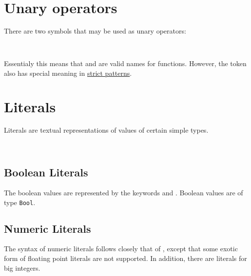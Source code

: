 \section{Unary operators}

There are two symbols that may be used as unary operators:

\begin{flushleft}
 \sym{!} \oder{} \\
   \oder{} 
\end{flushleft}

Essentialy this means that \sym{!} and  are valid names for  functions.
However, the token \sym{!} also has special meaning in  \hyperref[strictpats]{strict patterns}.

\section{Literals}

Literals are textual representations of values of certain simple types.

\begin{flushleft}
  \oder{}  \alt{}  \oder{}  \oder{} \\
  \oder{} 
\end{flushleft}


\subsection{Boolean Literals}

The boolean values are represented by the keywords  and . Boolean values are of type \texttt{Bool}.

\begin{flushleft}
  \oder{} 
\end{flushleft}

\subsection{Numeric Literals}

The syntax of numeric literals follows closely that of \java{}, except that some exotic form of floating point literals are not supported.
In addition, there are literals for big integers.

